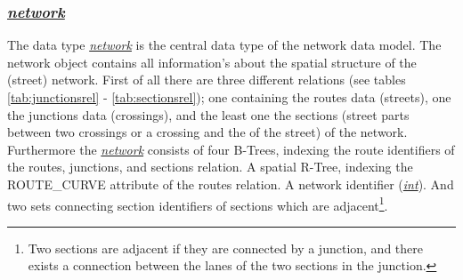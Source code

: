\documentclass[a4paper]{article}
\newcommand{\dt}[1]{\textsl{\underline{#1}}}
\begin{document}
\subsubsection{\dt{network}}
The data type \dt{network} is the central data type of the network data model. The network object contains all information's about the spatial structure of the (street) network. First of all there are three different relations (see tables \ref{tab:junctionsrel} - \ref{tab:sectionsrel}); one containing the routes data (streets), one the junctions data (crossings), and the least one the sections (street parts between two crossings or a crossing and the of the street) of the network. Furthermore the \dt{network} consists of four B-Trees, indexing the route identifiers of the routes, junctions, and sections relation. A spatial R-Tree, indexing the ROUTE\_CURVE attribute of the routes relation. A network identifier (\dt{int}). And two sets connecting section identifiers of sections which are adjacent\footnote{Two sections are adjacent if they are connected by a junction, and there exists a connection between the lanes of the two sections in the junction.}.
\end{document}
